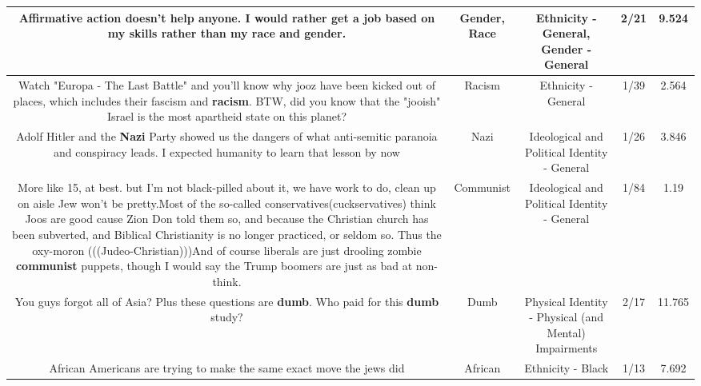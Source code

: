 \documentclass[11pt]{article}
\newlength\mylength
\begin{document}
\begin{center}
\begin{longtable}{|C{.65\mylength}|C{.30\mylength}|C{.12\mylength}|C{.12\mylength}|C{.12\mylength}|}
  \small Affirmative action doesn't help anyone. I would rather get a job based on my skills rather than my \textbf{race} and \textbf{gender}.\normalsize   & Gender, Race & Ethnicity - General, Gender - General & 2/21 & 9.524 \\  \hline
  \small Watch "Europa - The Last Battle" and you'll know why jooz have been kicked out of places, which includes their fascism and \textbf{racism}. BTW, did you know that the "jooish" Israel is the most apartheid state on this planet?\normalsize   & Racism & Ethnicity - General & 1/39 & 2.564 \\  \hline
  \small Adolf Hitler and the \textbf{Nazi} Party showed us the dangers of what anti-semitic paranoia and conspiracy leads. I expected humanity to learn that lesson by now\normalsize   & Nazi &  Ideological and Political Identity - General & 1/26 & 3.846 \\  \hline
  \small More like 15, at best. but I'm not black-pilled about it, we have work to do, clean up on aisle Jew won't be pretty.Most of the so-called conservatives(cuckservatives) think Joos are good cause Zion Don told them so, and because the Christian church has been subverted, and Biblical Christianity is no longer practiced, or seldom so. Thus the oxy-moron (((Judeo-Christian)))And of course liberals are just drooling zombie \textbf{communist} puppets, though I would say the Trump boomers are just as bad at non-think.\normalsize   & Communist &  Ideological and Political Identity - General & 1/84 & 1.19 \\  \hline
  \small You guys forgot all of Asia?  Plus these questions are \textbf{dumb}. Who paid for this \textbf{dumb} study?\normalsize   & Dumb & Physical Identity - Physical (and Mental) Impairments & 2/17 & 11.765 \\  \hline
  \small African Americans are trying to make the same exact move the jews did\normalsize   & African & Ethnicity - Black & 1/13 & 7.692 \\  \hline

\end{longtable}
\end{center}
\end{document}
